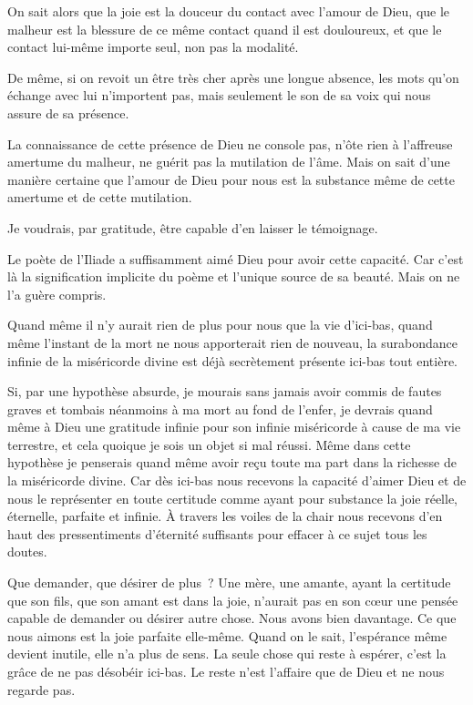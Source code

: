 \documentclass[french,twoside]{book} %
\begin{document}
On sait alors que la joie est la douceur du contact avec l'amour de Dieu, que le malheur est la blessure de ce même contact quand il est douloureux, et que le contact lui-même importe seul, non pas la modalité.\par
De même, si on revoit un être très cher après une longue absence, les mots qu'on échange avec lui n'importent pas, mais seulement le son de sa voix qui nous assure de sa présence.\par
La connaissance de cette présence de Dieu ne console pas, n'ôte rien à l'affreuse amertume du malheur, ne guérit pas la mutilation de l'âme. Mais on sait d'une manière certaine que l'amour de Dieu pour nous est la substance même de cette amertume et de cette mutilation.\par
Je voudrais, par gratitude, être capable d'en laisser le témoignage.\par
Le poète de l'Iliade a suffisamment aimé Dieu pour avoir cette capacité. Car c'est là la signification implicite du poème et l'unique source de sa beauté. Mais on ne l'a guère compris.\par
Quand même il n'y aurait rien de plus pour nous que la vie d'ici-bas, quand même l'instant de la mort ne nous apporterait rien de nouveau, la surabondance infinie de la miséricorde divine est déjà secrètement présente ici-bas tout entière.\par
Si, par une hypothèse absurde, je mourais sans jamais avoir commis de fautes graves et tombais néanmoins à ma mort au fond de l'enfer, je devrais quand même à Dieu une gratitude infinie pour son infinie miséricorde à cause de ma vie terrestre, et cela quoique je sois un objet si mal réussi. Même dans cette hypothèse je penserais quand même avoir reçu toute ma part dans la richesse de la miséricorde divine. Car dès ici-bas nous recevons la capacité d'aimer Dieu et de nous le représenter en toute certitude comme ayant pour substance la joie réelle, éternelle, parfaite et infinie. À travers les voiles de la chair nous recevons d'en haut des pressentiments d'éternité suffisants pour effacer à ce sujet tous les doutes.\par
Que demander, que désirer de plus ? Une mère, une amante, ayant la certitude que son fils, que son amant est dans la joie, n'aurait pas en son cœur une pensée capable de demander ou désirer autre chose. Nous avons bien davantage. Ce que nous aimons est la joie parfaite elle-même. Quand on le sait, l'espérance même devient inutile, elle n'a plus de sens. La seule chose qui reste à espérer, c'est la grâce de ne pas désobéir ici-bas. Le reste n'est l'affaire que de Dieu et ne nous regarde pas.\par
\end{document}
